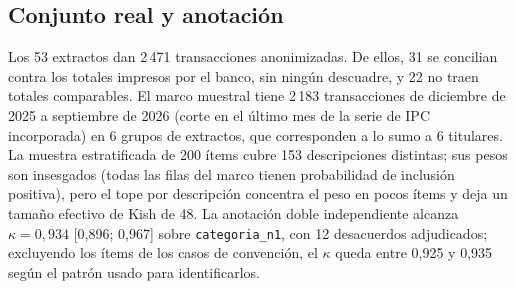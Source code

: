 \documentclass[journal]{IEEEtai}
\begin{document}
\subsection{Conjunto real y anotación}
Los 53 extractos dan 2\,471 transacciones anonimizadas. De ellos, 31 se concilian contra los totales impresos por el banco, sin ningún descuadre, y 22 no traen totales comparables. El marco muestral tiene 2\,183 transacciones de diciembre de 2025 a septiembre de 2026 (corte en el último mes de la serie de IPC incorporada) en 6 grupos de extractos, que corresponden a lo sumo a 6 titulares. La muestra estratificada de 200 ítems cubre 153 descripciones distintas; sus pesos son insesgados (todas las filas del marco tienen probabilidad de inclusión positiva), pero el tope por descripción concentra el peso en pocos ítems y deja un tamaño efectivo de Kish de 48. La anotación doble independiente alcanza $\kappa=0{,}934$ [0{,}896; 0{,}967] sobre \texttt{categoria\_n1}, con 12 desacuerdos adjudicados; excluyendo los ítems de los casos de convención, el $\kappa$ queda entre 0{,}925 y 0{,}935 según el patrón usado para identificarlos.
\end{document}
